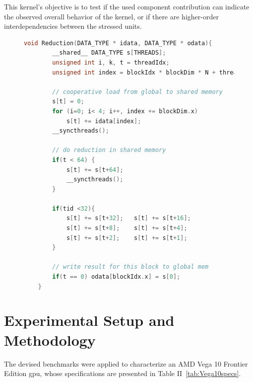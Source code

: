 This kernel's objective is to test if the used component contribution can indicate the observed overall behavior of the kernel, or if there are higher-order interdependencies between the stressed units.

\begin{figure}[htb]
    \begin{lstlisting}[language=C, caption=Reduction Kernel Code, label=lst:Redbench, basicstyle=\footnotesize\ttfamily,abovecaptionskip=0pt, captionpos=b]
    void Reduction(DATA_TYPE * idata, DATA_TYPE * odata){
        __shared__ DATA_TYPE s[THREADS];
        unsigned int i, k, t = threadIdx;
        unsigned int index = blockIdx * blockDim * N + threadIdx;
        
        // cooperative load from global to shared memory
        s[t] = 0;
        for (i=0; i< 4; i++, index += blockDim.x)
            s[t] += idata[index];
        __syncthreads();
        
        // do reduction in shared memory
        if(t < 64) {
            s[t] += s[t+64]; 
            __syncthreads(); 
        }
        
        if(tid <32){
            s[t] += s[t+32];   s[t] += s[t+16];
            s[t] += s[t+8];    s[t] += s[t+4];
            s[t] += s[t+2];    s[t] += s[t+1];
        }
        
        // write result for this block to global mem
        if(t == 0) odata[blockIdx.x] = s[0];
    }
    \end{lstlisting}
\end{figure}


\section{Experimental Setup and Methodology}

The devised benchmarks were applied to characterize an AMD Vega 10 Frontier Edition \acrshort{gpu}, whose specifications are presented in Table II~\ref{tab:Vega10specs}. 

